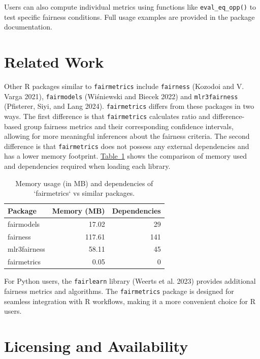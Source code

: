 \documentclass[10pt,a4paper,onecolumn]{article}
\begin{document}
Users can also compute individual metrics using functions like
\texttt{eval\_eq\_opp()} to test specific fairness conditions. Full
usage examples are provided in the package documentation.

\section{Related Work}\label{related-work}

Other R packages similar to \texttt{fairmetrics} include
\texttt{fairness} (Kozodoi and V. Varga 2021), \texttt{fairmodels}
(Wiśniewski and Biecek 2022) and \texttt{mlr3fairness} (Pfisterer, Siyi,
and Lang 2024). \texttt{fairmetrics} differs from these packages in two
ways. The first difference is that \texttt{fairmetrics} calculates ratio
and difference-based group fairness metrics and their corresponding
confidence intervals, allowing for more meaningful inferences about the
fairness criteria. The second difference is that \texttt{fairmetrics}
does not possess any external dependencies and has a lower memory
footprint.
\hyperref[tab:memory_dep_usage]{Table~\ref*{tab:memory_dep_usage}} shows
the comparison of memory used and dependencies required when loading
each library.

\begin{table}[ht]
\centering
\begin{tabular}{l r r}
\hline
\textbf{Package} & \textbf{Memory (MB)} & \textbf{Dependencies} \\
\hline
fairmodels  & 17.02  & 29 \\
fairness    & 117.61 & 141\\
mlr3fairness & 58.11  & 45 \\
fairmetrics & 0.05   & 0  \\
\hline
\end{tabular}
\caption{Memory usage (in MB) and dependencies of `fairmetrics` vs similar packages.}
\label{tab:memory_dep_usage}
\end{table}

For Python users, the \texttt{fairlearn} library (Weerts et al. 2023)
provides additional fairness metrics and algorithms. The
\texttt{fairmetrics} package is designed for seamless integration with R
workflows, making it a more convenient choice for R users.

\section{Licensing and Availability}\label{licensing-and-availability}
\end{document}
